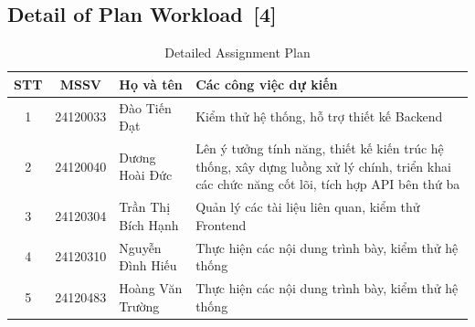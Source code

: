 \documentclass[12pt, a4paper]{article}
\begin{document}
\subsection[Detail of Plan Workload]{Detail of Plan Workload \,{\normalfont\small\textcolor{cyan!70!black}{[4]}}}
\renewcommand{\arraystretch}{1.5}
\begin{table}[H]
    \centering
    \begin{tabularx}{\textwidth}{|c|c|l|X|}
    \hline
    \textbf{STT} & \textbf{MSSV} & \textbf{Họ và tên} & \textbf{Các công việc dự kiến} \\
    \hline
    
    1 & 24120033 & Đào Tiến Đạt & Kiểm thử hệ thống, hỗ trợ thiết kế Backend \\[1cm]
    \hline
    2 & 24120040 & Dương Hoài Đức & Lên ý tưởng tính năng, thiết kế kiến trúc hệ thống, xây dựng luồng xử lý chính, triển khai các chức năng cốt lõi, tích hợp API bên thứ ba \\[1cm]
    \hline
    3 & 24120304 & Trần Thị Bích Hạnh & Quản lý các tài liệu liên quan, kiểm thử Frontend \\[1cm]
    \hline
    4 & 24120310 & Nguyễn Đình Hiếu & Thực hiện các nội dung trình bày, kiểm thử hệ thống \\[1cm]
    \hline
    5 & 24120483 & Hoàng Văn Trường & Thực hiện các nội dung trình bày, kiểm thử hệ thống \\[1cm]
    \hline
    \end{tabularx}
    \caption{Detailed Assignment Plan}
\end{table}
\end{document}
